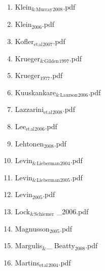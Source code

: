 \documentclass[11pt]{article}
\begin{document}
\begin{enumerate}
\begin{enumerate}
\item Klein$_{\text{\&}}$$_{\text{Murray}}$$_{\text{2008}}$.pdf
\label{sec-1-1-1-1-11-19-17-81}

\item Klein$_{\text{2006}}$.pdf
\label{sec-1-1-1-1-11-19-17-82}

\item Kofler$_{\text{et}}$$_{\text{al}}$$_{\text{2007}}$.pdf
\label{sec-1-1-1-1-11-19-17-83}

\item Krueger$_{\text{\&}}$$_{\text{Gilden}}$$_{\text{1997}}$.pdf
\label{sec-1-1-1-1-11-19-17-84}

\item Krueger$_{\text{1977}}$.pdf
\label{sec-1-1-1-1-11-19-17-85}

\item Kuuskankare$_{\text{\&}}$$_{\text{Laurson}}$$_{\text{2006}}$.pdf
\label{sec-1-1-1-1-11-19-17-86}

\item Lazzarini$_{\text{et}}$$_{\text{al}}$$_{\text{2008}}$.pdf
\label{sec-1-1-1-1-11-19-17-87}

\item Lee$_{\text{et}}$$_{\text{al}}$$_{\text{2006}}$.pdf
\label{sec-1-1-1-1-11-19-17-88}

\item Lehtonen$_{\text{2008}}$.pdf
\label{sec-1-1-1-1-11-19-17-89}

\item Levin$_{\text{\&}}$$_{\text{Lieberman}}$$_{\text{2004}}$.pdf
\label{sec-1-1-1-1-11-19-17-90}

\item Levin$_{\text{\&}}$$_{\text{Lieberman}}$$_{\text{2005}}$.pdf
\label{sec-1-1-1-1-11-19-17-91}

\item Levin$_{\text{2005}}$.pdf
\label{sec-1-1-1-1-11-19-17-92}

\item Lock$_{\text{\&}}$$_{\text{Schiemer}}$ \_2006.pdf
\label{sec-1-1-1-1-11-19-17-93}

\item Magnusson$_{\text{2005}}$.pdf
\label{sec-1-1-1-1-11-19-17-94}

\item Margulis$_{\text{\&}}$\_ Beatty$_{\text{2008}}$.pdf
\label{sec-1-1-1-1-11-19-17-95}

\item Martins$_{\text{et}}$$_{\text{al}}$$_{\text{2004}}$.pdf
\label{sec-1-1-1-1-11-19-17-96}


\end{enumerate}
\end{enumerate}
\end{document}
